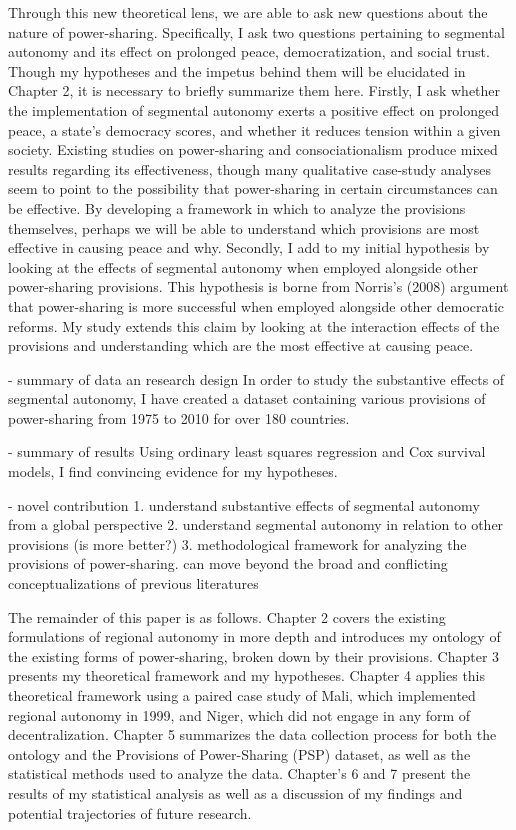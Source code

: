 \documentclass[12pt]{article}
\begin{document}
Through this new theoretical lens, we are able to ask new questions about the nature of power-sharing. Specifically, I ask two questions pertaining to segmental autonomy and its effect on prolonged peace, democratization, and social trust. Though my hypotheses and the impetus behind them will be elucidated in Chapter 2, it is necessary to briefly summarize them here. Firstly, I ask whether the implementation of segmental autonomy exerts a positive effect on prolonged peace, a state’s democracy scores, and whether it reduces tension within a given society. Existing studies on power-sharing and consociationalism produce mixed results regarding its effectiveness, though many qualitative case-study analyses seem to point to the possibility that power-sharing in certain circumstances can be effective. By developing a framework in which to analyze the provisions themselves, perhaps we will be able to understand which provisions are most effective in causing peace and why. Secondly, I add to my initial hypothesis by looking at the effects of segmental autonomy when employed alongside other power-sharing provisions. This hypothesis is borne from Norris’s (2008) argument that power-sharing is more successful when employed alongside other democratic reforms. My study extends this claim by looking at the interaction effects of the provisions and understanding which are the most effective at causing peace.

- summary of data an research design 
In order to study the substantive effects of segmental autonomy, I have created a dataset containing various provisions of power-sharing from 1975 to 2010 for over 180 countries.  

- summary of results
Using ordinary least squares regression and Cox survival models, I find convincing evidence for my hypotheses.
 
- novel contribution 
1. understand substantive effects of segmental autonomy from a global perspective
2. understand segmental autonomy in relation to other provisions (is more better?)
3. methodological framework for analyzing the provisions of power-sharing. can move beyond the broad and conflicting conceptualizations of previous literatures

The remainder of this paper is as follows. Chapter 2 covers the existing formulations of regional autonomy in more depth and introduces my ontology of the existing forms of power-sharing, broken down by their provisions. Chapter 3 presents my theoretical framework and my hypotheses. Chapter 4 applies this theoretical framework using a paired case study of Mali, which implemented regional autonomy in 1999, and Niger, which did not engage in any form of decentralization. Chapter 5 summarizes the data collection process for both the ontology and the Provisions of Power-Sharing (PSP) dataset, as well as the statistical methods used to analyze the data. Chapter's 6 and 7 present the results of my statistical analysis as well as a discussion of my findings and potential trajectories of future research. 
\end{document}
